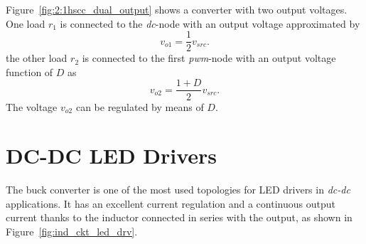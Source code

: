 Figure~\ref{fig:2:1hscc_dual_output} shows a converter with two output voltages. One load $r_1$ is connected to the \emph{dc}-node with an output voltage approximated by
\begin{equation}
v_{o1} = \frac{1}{2} v_{src}.
\end{equation}
the other load $r_2$ is connected to the first \emph{pwm}-node with an output voltage function of $D$ as
\begin{equation}
v_{o2} = \frac{1+D}{2} v_{src}.
\end{equation}
The voltage $v_{o2}$ can be regulated by means of $D$.

\section{DC-DC LED Drivers}
The buck converter is one of the most used topologies for LED drivers in \emph{dc-dc} applications. It has an excellent current regulation and a continuous output current thanks to the inductor connected in series with the output, as shown in Figure~\ref{fig:ind_ckt_led_drv}.

